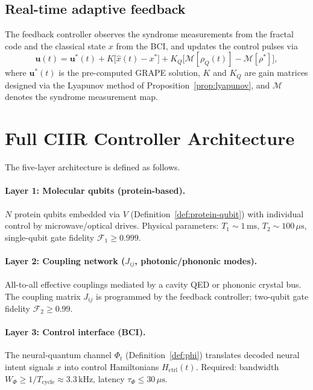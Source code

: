 \subsection{Real-time adaptive feedback}

The feedback controller observes the syndrome measurements from the
fractal code and the classical state $x$ from the BCI, and updates the
control pulses via
\begin{equation}\label{eq:feedback-law}
  \mathbf{u}(t) = \mathbf{u}^*(t) + K\!\bigl[\hat{x}(t) - x^*\bigr]
                 + K_Q\!\bigl[\mathcal{M}[\rho_Q(t)] - \mathcal{M}[\rho^*]\bigr],
\end{equation}
where $\mathbf{u}^*(t)$ is the pre-computed GRAPE solution, $K$ and
$K_Q$ are gain matrices designed via the Lyapunov method of
Proposition~\ref{prop:lyapunov}, and $\mathcal{M}$ denotes the syndrome
measurement map.

\section{Full CIIR Controller Architecture}
\label{sec:ch21-architecture}

The five-layer architecture is defined as follows.

\paragraph{Layer 1: Molecular qubits (protein-based).}
$N$ protein qubits embedded via $V$ (Definition~\ref{def:protein-qubit})
with individual control by microwave/optical drives.  Physical parameters:
$T_1 \sim 1\,\text{ms}$, $T_2 \sim 100\,\mu\text{s}$,
single-qubit gate fidelity $\mathcal{F}_1 \geq 0.999$.

\paragraph{Layer 2: Coupling network ($J_{ij}$, photonic/phononic modes).}
All-to-all effective couplings mediated by a cavity QED or phononic
crystal bus.  The coupling matrix $J_{ij}$ is programmed by the
feedback controller; two-qubit gate fidelity $\mathcal{F}_2 \geq 0.99$.

\paragraph{Layer 3: Control interface (BCI).}
The neural-quantum channel $\Phi_t$ (Definition~\ref{def:phi})
translates decoded neural intent signals $x$ into control
Hamiltonians $H_{\mathrm{ctrl}}(t)$.  Required: bandwidth
$W_\Phi \geq 1/T_{\mathrm{cycle}} \approx 3.3\,\text{kHz}$, latency
$\tau_\Phi \leq 30\,\mu\text{s}$.

